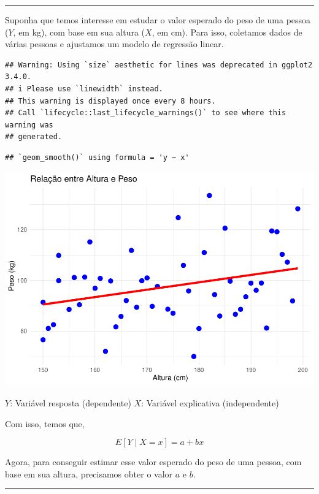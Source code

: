 \documentclass[
]{book}
\begin{document}
\begin{center}\rule{0.5\linewidth}{0.5pt}\end{center}

Suponha que temos interesse em estudar o valor esperado do peso de uma pessoa (\(Y\), em kg), com base em sua altura (\(X\), em cm). Para isso, coletamos dados de várias pessoas e ajustamos um modelo de regressão linear.

\begin{verbatim}
## Warning: Using `size` aesthetic for lines was deprecated in ggplot2 3.4.0.
## i Please use `linewidth` instead.
## This warning is displayed once every 8 hours.
## Call `lifecycle::last_lifecycle_warnings()` to see where this warning was
## generated.
\end{verbatim}

\begin{verbatim}
## `geom_smooth()` using formula = 'y ~ x'
\end{verbatim}

\begin{center}\includegraphics{AED_files/figure-latex/graf_regrecao-1} \end{center}

\(Y\): Variável resposta (dependente)
\(X\): Variável explicativa (independente)

Com isso, temos que,

\[
E[Y \mid X = x] = a + bx
\]

Agora, para conseguir estimar esse valor esperado do peso de uma pessoa, com base em sua altura, precisamos obter o valor \(a\) e \(b\).

\begin{center}\rule{0.5\linewidth}{0.5pt}\end{center}
\end{document}
